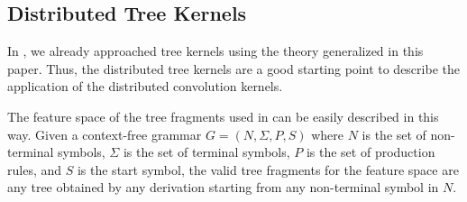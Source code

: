 \documentclass[twoside,11pt]{article}
\def\comment#1#2{}
\begin{document}
\subsection{Distributed Tree Kernels\comment{REVISED}{}}
\label{sec:T}


In \cite{Zanzotto2012193}, we already approached tree kernels using the theory generalized in this paper. Thus, the distributed tree kernels are a good starting point to describe the application of the distributed convolution kernels.





The feature space of the tree fragments used in \cite{Collins2002} can be easily described in this way. Given a context-free grammar $G=(N,\Sigma,P,S)$ where $N$ is the set of non-terminal symbols, $\Sigma$ is the set of terminal symbols, $P$ is the set of production rules, and $S$ is the start symbol, the valid tree fragments for the feature space are any tree obtained by any derivation starting from any non-terminal symbol in $N$. 
\end{document}
